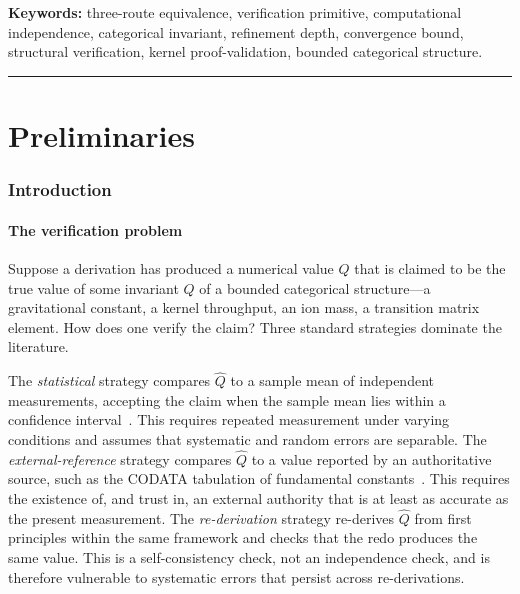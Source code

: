 \documentclass[twocolumn,11pt,a4paper]{article}
\newcommand{\Inv}{Q}
\begin{document}
\noindent\textbf{Keywords:} three-route equivalence, verification primitive, computational independence, categorical invariant, refinement depth, convergence bound, structural verification, kernel proof-validation, bounded categorical structure.

\tableofcontents

\vspace{6pt}
\hrule
\vspace{6pt}

\part{Preliminaries}

\section{Introduction}
\label{sec:intro}

\subsection{The verification problem}

Suppose a derivation has produced a numerical value $\hat\Inv$ that is claimed to be the true value of some invariant $\Inv$ of a bounded categorical structure---a gravitational constant, a kernel throughput, an ion mass, a transition matrix element. How does one verify the claim? Three standard strategies dominate the literature.

The \emph{statistical} strategy compares $\hat\Inv$ to a sample mean of independent measurements, accepting the claim when the sample mean lies within a confidence interval~\citep{jaynes2003probability,bevington2003data}. This requires repeated measurement under varying conditions and assumes that systematic and random errors are separable. The \emph{external-reference} strategy compares $\hat\Inv$ to a value reported by an authoritative source, such as the CODATA tabulation of fundamental constants~\citep{codata2018}. This requires the existence of, and trust in, an external authority that is at least as accurate as the present measurement. The \emph{re-derivation} strategy re-derives $\hat\Inv$ from first principles within the same framework and checks that the redo produces the same value. This is a self-consistency check, not an independence check, and is therefore vulnerable to systematic errors that persist across re-derivations.
\end{document}
